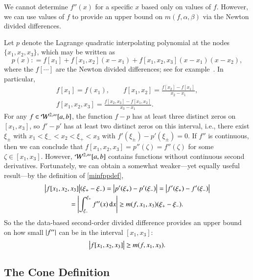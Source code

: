 \documentclass[review]{elsarticle}
\theoremstyle{definition}
\begin{document}
We cannot determine $f''(x)$ for a specific $x$ based only on values of $f$. However,
we can use values of $f$ to provide an upper bound on $m(f,\alpha, \beta)$ via the Newton divided differences.

Let $p$ denote the Lagrange quadratic interpolating polynomial at the nodes
$\{x_1, x_2, x_3\}$, which may be written as
\begin{equation*}
p(x) : = f[x_1] + f[x_1, x_2](x-x_1) + f[x_1, x_2, x_3](x-x_1)(x-x_2),
\end{equation*}
where the $f[\cdots]$ are the Newton divided differences; see for example~\cite{CheKin12a}. In particular,
\begin{gather}
\nonumber
f[x_1] = f(x_1), \qquad f[x_1, x_2] = \frac{f[x_2] - f[x_1]}{x_2-x_1},  \\
f[x_1, x_2,x_3] = \frac{f[x_2,x_3] - f[x_1,x_2]}{x_3-x_1}. \label{divdiff}
\end{gather}
For any $f \in
\mathcal{W}^{2,\infty}[a,b]$, the function $f - p$ has at least three distinct zeros on
$[x_1, x_3]$, so $f' - p'$ has at least two distinct zeros on this interval,
i.e., there exist $\xi_\pm$ with $x_1 < \xi_- < x_2 < \xi_+ < x_3$ with
$f'(\xi_\pm) - p'(\xi_{\pm}) = 0$. If $f''$ is continuous, then we can conclude
that $ f[x_1, x_2, x_3]= p''(\zeta) =f''(\zeta) $ for some $\zeta \in [x_1,
x_3]$. However, $\mathcal{W}^{2,\infty}[a,b]$ contains functions without continuous
second derivatives. Fortunately, we can obtain a somewhat weaker---yet equally useful result---by the definition of \eqref{minfppdef},
\begin{multline*}
\bigl \lvert f[x_1, x_2, x_3] \bigr \rvert(\xi_+  - \xi_-) = \left \lvert p'(\xi_+) - p'(\xi_-) \right \rvert =  \left \lvert f'(\xi_+) - f'(\xi_-) \right \rvert \\
= \left \lvert \int_{\xi_-}^{\xi_+} f''(x) \, {\rm d} x \right \rvert \ge m(f,x_1, x_3) (\xi_+  - \xi_-).
\end{multline*}
So the the data-based second-order divided difference provides an upper
bound on how small $\left \lvert f'' \right \rvert$ can be in the interval $[x_1, x_3]$:
\begin{equation}
\bigl \lvert f[x_1, x_2, x_3] \bigr \rvert \ge m(f,x_1, x_3).
\end{equation}

\subsection{The Cone Definition}  \label{sec:conedef}
\end{document}
